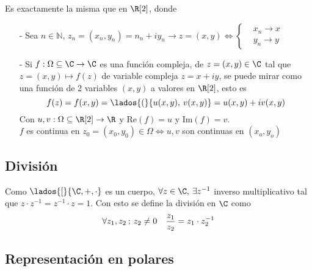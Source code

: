 Es exactamente la misma que en $\R[2]$, donde

\begin{itemize}
    \item[-] Sea $n \in \mathbb{N}$, $z_n = (x_n, y_n) = n_n + iy_n \longrightarrow z = (x, y) 
    \iff \begin{cases} 
    &x_n \longrightarrow x\\ 
    &y_n \longrightarrow y
    \end{cases}$ 

    \item[-] Si $f: \Omega \subseteq \C \to \C$ es una función compleja, de $z = (x, y) \in \C$ tal que $z = (x, y) \mapsto f(z)$ de variable compleja $z = x + iy$, se puede mirar como una función de 2 variables $(x,y)$ a valores en $\R[2]$, esto es
    \[ f(z) = f(x,y) = \lados{(}{u(x,y), \hspace{2px} v(x,y)} = u(x,y) + iv(x, y) \]
    Con $u,v: \Omega \subseteq \R[2] \to \R$ y $\mathrm{Re}(f) = u$ y $\mathrm{Im}(f) = v$.\\

    $f$ es continua en $z_0 = (x_0, y_0) \in \Omega \iff u,v$ son continuas en $(x_o, y_o)$
 
\end{itemize}

\subsection{División}
Como $\lados{[}{\C, +, \cdot}$ es un cuerpo, $\forall z \in \C, \hspace{2px} \exists z^{-1}$ inverso multiplicativo tal que $z\cdot z^{-1} = z^{-1}\cdot z = 1$. Con esto se define la división en $\C$ como
\[ \forall z_1,z_2 \hspace{2px}; \hspace{2px} z_2 \ne 0 \quad \frac{z_1}{z_2} = z_1\cdot z_2^{-1}\]

\subsection{Representación en polares}


